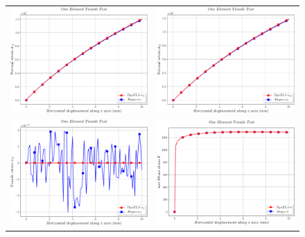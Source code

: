 \begin{figure}[h]
\begin{centering}
\begin{tabular}{cc}
\includegraphics[width=0.45\columnwidth]{Figures/Samples/Element/Tensile_stress_11} & \includegraphics[width=0.45\columnwidth]{Figures/Samples/Element/Tensile_stress_22}\tabularnewline
\includegraphics[width=0.45\columnwidth]{Figures/Samples/Element/Tensile_stress_12} & \includegraphics[width=0.45\columnwidth]{Figures/Samples/Element/Tensile_vonMises}\tabularnewline

\end{tabular}
\end{centering}
\end{figure}
